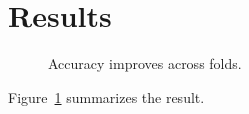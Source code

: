 \documentclass{article}
\begin{document}
\section{Results}
\begin{figure}
\centering
{}
\caption{Accuracy improves across folds.\label{fig:accuracy}}
\end{figure}
Figure~\ref{fig:accuracy} summarizes the result.
\end{document}
